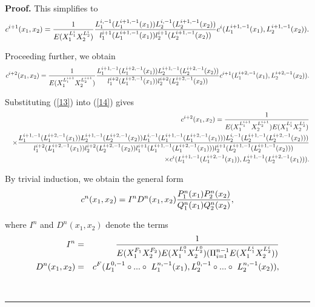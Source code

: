 \documentclass[onecolumn]{article}
\newenvironment{proof}[1][Proof]{\noindent\textbf{#1.} }{\ \rule{0.5em}{0.5em}}
\begin{document}
\begin{proof}
This simplifies to%
\begin{equation}
c^{i+1}(x_{1},x_{2})=\frac{1}{E(X_{1}^{L_{1}^{i}}X_{2}^{L_{2}^{i}})}\frac{%
L_{1}^{i,-1}(L_{1}^{i+1,-1}(x_{1}))L_{2}^{i,-1}(L_{2}^{i+1,-1}(x_{2}))}{%
l_{1}^{i+1}(L_{1}^{i+1,-1}(x_{1}))l_{2}^{i+1}(L_{2}^{i+1,-1}(x_{2}))}%
c^{i}(L_{1}^{i+1,-1}(x_{1}),L_{2}^{i+1,-1}(x_{2})).  \label{13}
\end{equation}

Proceeding further, we obtain%
\begin{equation}
c^{i+2}(x_{1},x_{2})=\frac{1}{E(X_{1}^{L_{1}^{i+1}}X_{2}^{L_{2}^{i+1}})}%
\frac{%
L_{1}^{i+1,-1}(L_{1}^{i+2,-1}(x_{1}))L_{2}^{i+1,-1}(L_{2}^{i+2,-1}(x_{2}))}{%
l_{1}^{i+2}(L_{1}^{i+2,-1}(x_{1}))l_{2}^{i+2}(L_{2}^{i+2,-1}(x_{2}))}%
c^{i+1}(L_{1}^{i+2,-1}(x_{1}),L_{2}^{i+2,-1}(x_{2})).  \label{14}
\end{equation}

Substituting (\ref{13}) into (\ref{14}) gives%
\begin{eqnarray}
&&c^{i+2}(x_{1},x_{2})=\frac{1}{%
E(X_{1}^{L_{1}^{i+1}}X_{2}^{L_{2}^{i+1}})E(X_{1}^{L_{1}^{i}}X_{2}^{L_{2}^{i}})%
}  \notag \\
&&\times \frac{%
L_{1}^{i+1,-1}(L_{1}^{i+2,-1}(x_{1}))L_{2}^{i+1,-1}(L_{2}^{i+2,-1}(x_{2}))L_{1}^{i,-1}(L_{1}^{i+1,-1}(L_{1}^{i+2,-1}(x_{1})))L_{2}^{i,-1}(L_{2}^{i+1,-1}(L_{2}^{i+2,-1}(x_{2})))%
}{%
l_{1}^{i+2}(L_{1}^{i+2,-1}(x_{1}))l_{2}^{i+2}(L_{2}^{i+2,-1}(x_{2}))l_{1}^{i+1}(L_{1}^{i+1,-1}(L_{1}^{i+2,-1}(x_{1})))l_{2}^{i+1}(L_{2}^{i+1,-1}(L_{2}^{i+1,-1}(x_{2})))%
}  \notag \\
&&\times
c^{i}(L_{1}^{i+1,-1}(L_{1}^{i+2,-1}(x_{1})),L_{2}^{i+1,-1}(L_{2}^{i+2,-1}(x_{1}))).
\label{15}
\end{eqnarray}

By trivial induction, we obtain the general form%
\begin{equation}
c^{n}(x_{1},x_{2})=I^{n}D^{n}(x_{1},x_{2})\frac{%
P_{1}^{n}(x_{1})P_{2}^{n}(x_{2})}{Q_{1}^{n}(x_{1})Q_{2}^{n}(x_{2})},
\label{16}
\end{equation}

where $I^{n}$ and $D^{n}(x_{1},x_{2})$ denote the terms%
\begin{eqnarray}
I^{n} &=&\frac{1}{%
E(X_{1}^{F_{1}}X_{2}^{F_{2}})E(X_{1}^{L_{1}^{0}}X_{2}^{L_{2}^{0}})(\Pi
_{i=1}^{n-1}E(X_{1}^{L_{1}^{i}}X_{2}^{L_{2}^{i}}))}  \notag \\
D^{n}(x_{1},x_{2}) &=&c^{F}(L_{1}^{0,-1}\circ ...\circ \text{ }%
L_{1}^{n,-1}(x_{1}),L_{2}^{0,-1}\circ ...\circ \text{ }L_{2}^{n,-1}(x_{2})),
\label{16.1}
\end{eqnarray}


\end{proof}
\end{document}

